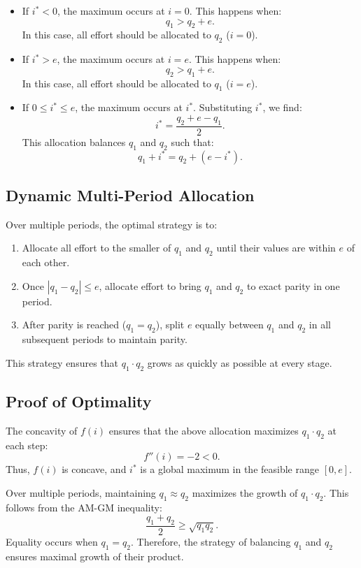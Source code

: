 \documentclass{article}
\begin{document}
\begin{itemize}
    \item If \( i^* < 0 \), the maximum occurs at \( i = 0 \). This happens when:
    \[
    q_1 > q_2 + e.
    \]
    In this case, all effort should be allocated to \( q_2 \) (\( i = 0 \)).
    \item If \( i^* > e \), the maximum occurs at \( i = e \). This happens when:
    \[
    q_2 > q_1 + e.
    \]
    In this case, all effort should be allocated to \( q_1 \) (\( i = e \)).
    \item If \( 0 \leq i^* \leq e \), the maximum occurs at \( i^* \). Substituting \( i^* \), we find:
    \[
    i^* = \frac{q_2 + e - q_1}{2}.
    \]
    This allocation balances \( q_1 \) and \( q_2 \) such that:
    \[
    q_1 + i^* = q_2 + (e - i^*).
    \]
\end{itemize}

\subsection{Dynamic Multi-Period Allocation}

Over multiple periods, the optimal strategy is to:
\begin{enumerate}
    \item Allocate all effort to the smaller of \( q_1 \) and \( q_2 \) until their values are within \( e \) of each other.
    \item Once \( |q_1 - q_2| \leq e \), allocate effort to bring \( q_1 \) and \( q_2 \) to exact parity in one period.
    \item After parity is reached (\( q_1 = q_2 \)), split \( e \) equally between \( q_1 \) and \( q_2 \) in all subsequent periods to maintain parity.
\end{enumerate}

This strategy ensures that \( q_1 \cdot q_2 \) grows as quickly as possible at every stage.

\subsection{Proof of Optimality}

The concavity of \( f(i) \) ensures that the above allocation maximizes \( q_1 \cdot q_2 \) at each step:
\[
f''(i) = -2 < 0.
\]
Thus, \( f(i) \) is concave, and \( i^* \) is a global maximum in the feasible range \( [0, e] \).

Over multiple periods, maintaining \( q_1 \approx q_2 \) maximizes the growth of \( q_1 \cdot q_2 \). This follows from the AM-GM inequality:
\[
\frac{q_1 + q_2}{2} \geq \sqrt{q_1 q_2}.
\]
Equality occurs when \( q_1 = q_2 \). Therefore, the strategy of balancing \( q_1 \) and \( q_2 \) ensures maximal growth of their product.
\end{document}
